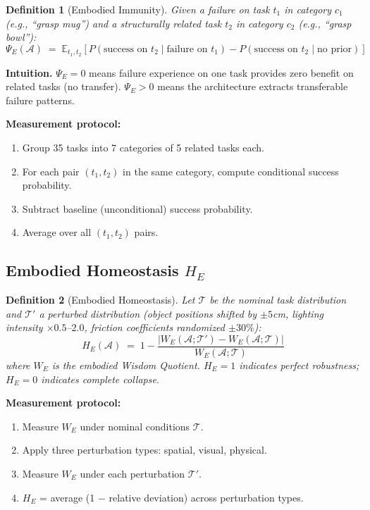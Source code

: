 \documentclass{article}
\newtheorem{definition}{Definition}
\newcommand{\cA}{\mathcal{A}}
\newcommand{\cT}{\mathcal{T}}
\newcommand{\E}{\mathbb{E}}
\begin{document}
\begin{definition}[Embodied Immunity]
Given a failure on task $t_1$ in category $c_1$ (e.g., ``grasp mug'') and a structurally related task $t_2$ in category $c_2$ (e.g., ``grasp bowl''):
\begin{equation}
    \Psi_E(\cA) \;=\; \E_{t_1, t_2}\left[P(\text{success on } t_2 \mid \text{failure on } t_1) - P(\text{success on } t_2 \mid \text{no prior})\right]
\end{equation}
\end{definition}

\textbf{Intuition.} $\Psi_E = 0$ means failure experience on one task provides zero benefit on related tasks (no transfer). $\Psi_E > 0$ means the architecture extracts transferable failure patterns.

\textbf{Measurement protocol:}
\begin{enumerate}[itemsep=1pt]
    \item Group 35 tasks into 7 categories of 5 related tasks each.
    \item For each pair $(t_1, t_2)$ in the same category, compute conditional success probability.
    \item Subtract baseline (unconditional) success probability.
    \item Average over all $(t_1, t_2)$ pairs.
\end{enumerate}

\subsection{Embodied Homeostasis $H_E$}

\begin{definition}[Embodied Homeostasis]
Let $\cT$ be the nominal task distribution and $\cT'$ a perturbed distribution (object positions shifted by $\pm 5$cm, lighting intensity $\times 0.5$--$2.0$, friction coefficients randomized $\pm 30\%$):
\begin{equation}
    H_E(\cA) \;=\; 1 - \frac{|W_E(\cA; \cT') - W_E(\cA; \cT)|}{W_E(\cA; \cT)}
\end{equation}
where $W_E$ is the embodied Wisdom Quotient.
$H_E = 1$ indicates perfect robustness; $H_E = 0$ indicates complete collapse.
\end{definition}

\textbf{Measurement protocol:}
\begin{enumerate}[itemsep=1pt]
    \item Measure $W_E$ under nominal conditions $\cT$.
    \item Apply three perturbation types: spatial, visual, physical.
    \item Measure $W_E$ under each perturbation $\cT'$.
    \item $H_E$ = average (1 $-$ relative deviation) across perturbation types.
\end{enumerate}
\end{document}

